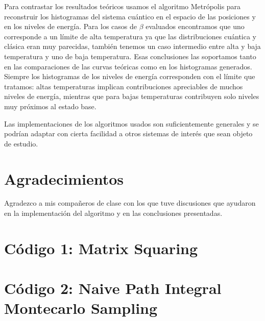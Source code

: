 \documentclass[%
 reprint,
 amsmath,amssymb,
 aps,
 pra,
]{revtex4-2}
\begin{document}
Para contrastar los resultados teóricos usamos el algoritmo Metrópolis para reconstruir los histogramas del sistema cuántico en el espacio de las posiciones y en los niveles de energía. Para los casos de $\beta$ evaluados encontramos que uno corresponde a un límite de alta temperatura ya que las distribuciones cuántica y clásica eran muy parecidas, también tenemos un caso intermedio entre alta y baja temperatura y uno de baja temperatura. Esas conclusiones las soportamos tanto en las comparaciones de las curvas teóricas como en los histogramas generados. Siempre los histogramas de los niveles de energía corresponden con el límite que tratamos: altas temperaturas implican contribuciones apreciables de muchos niveles de energía, mientras que para bajas temperaturas contribuyen solo niveles muy próximos al estado base.

Las implementaciones de los algoritmos usados son suficientemente generales y se podrían adaptar con cierta facilidad a otros sistemas de interés que sean objeto de estudio.

\section*{Agradecimientos}
Agradezco a mis compañeros de clase con los que tuve discusiones que ayudaron en la implementación del algoritmo y en las conclusiones presentadas. 

\nocite{*}


\newpage



\appendix

\begin{widetext}

\section{Código 1: Matrix Squaring\label{appx:codigo_matrix_squaring}}


\section{Código 2: Naive Path Integral Montecarlo Sampling\label{appx:codigo_temperatura_finita}}


\end{widetext}
\end{document}
